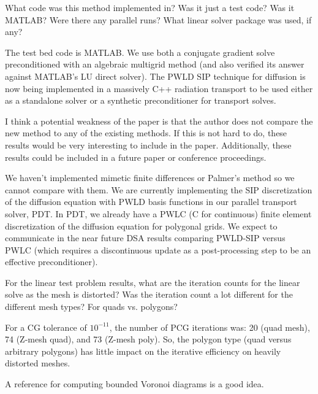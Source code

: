 \documentclass{article}
\begin{document}
\bigskip

{
\color{blue}
What code was this method implemented in? Was it just a test code? Was it MATLAB? Were there any
parallel runs? What linear solver package was used, if any?
}

The test bed code is MATLAB. We use both a conjugate gradient solve
preconditioned with an algebraic multigrid method (and also verified its answer against MATLAB's LU direct solver). 
The PWLD SIP technique for diffusion is now being 
implemented in a massively C++ radiation transport to be used either as a standalone solver or a 
synthetic preconditioner for transport solves. 



\bigskip


{
\color{blue}
I think a potential weakness of the paper is that the author does not compare the new method to any of
the existing methods. If this is not hard to do, these results would be very interesting to include in the
paper. Additionally, these results could be included in a future paper or conference proceedings.
}

We haven't implemented mimetic finite differences or Palmer's method so we cannot compare with them. We are
currently implementing the SIP discretization of the diffusion equation with PWLD basis functions 
in our parallel transport solver, PDT.  In PDT, we already have a PWLC (C for continuous)
finite element discretization of the diffusion equation for polygonal grids. We expect to communicate in the near
future DSA results comparing PWLD-SIP versus PWLC (which requires a discontinuous update as a post-processing step to
be an effective preconditioner).
 \bigskip


{
\color{blue}
For the linear test problem results, what are the iteration counts for the linear solve as the mesh is
distorted? Was the iteration count a lot different for the different mesh types? For quads vs. polygons?
}


For a CG tolerance of $10^{-11}$, the number of PCG iterations was: 20 (quad mesh),
74 (Z-mesh quad), and 73 (Z-mesh poly). So, the polygon type (quad versus arbitrary polygons) has little impact on
the iterative efficiency on heavily distorted meshes.
\bigskip


{
\color{blue}
A reference for computing bounded Voronoi diagrams is a good idea.
}
\end{document}
